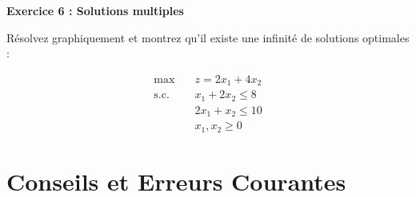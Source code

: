 \documentclass[12pt,a4paper]{article}
\begin{document}
\begin{exercice}
\textbf{Exercice 6 : Solutions multiples}

Résolvez graphiquement et montrez qu'il existe une infinité de solutions optimales :

\begin{align*}
\max \quad & z = 2x_1 + 4x_2\\
\text{s.c.} \quad & x_1 + 2x_2 \leq 8\\
& 2x_1 + x_2 \leq 10\\
& x_1, x_2 \geq 0
\end{align*}
\end{exercice}

\newpage
\section{Conseils et Erreurs Courantes}
\end{document}
